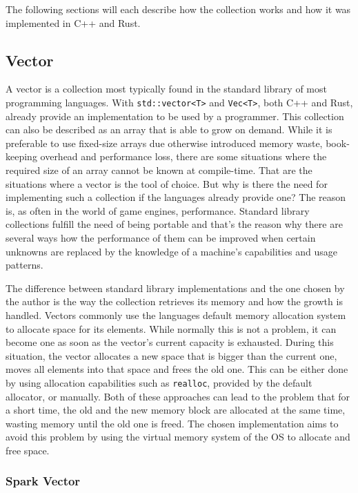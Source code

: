 The following sections will each describe how the collection works and how it was implemented in C++ and Rust.

\subsection{Vector}

A vector is a collection most typically found in the standard library of most programming languages. With \texttt{std::vector<T>} and \texttt{Vec<T>}, both C++ and Rust, already provide an implementation to be used by a programmer. This collection can also be described as an array that is able to grow on demand. While it is preferable to use fixed-size arrays due otherwise introduced memory waste, book-keeping overhead and performance loss, there are some situations where the required size of an array cannot be known at compile-time. That are the situations where a vector is the tool of choice. But why is there the need for implementing such a collection if the languages already provide one? The reason is, as often in the world of game engines, performance. Standard library collections fulfill the need of being portable and that's the reason why there are several ways how the performance of them can be improved when certain unknowns are replaced by the knowledge of a machine's capabilities and usage patterns. 

The difference between standard library implementations and the one chosen by the author is the way the collection retrieves its memory and how the growth is handled. Vectors commonly use the languages default memory allocation system to allocate space for its elements. While normally this is not a problem, it can become one as soon as the vector's current capacity is exhausted. During this situation, the vector allocates a new space that is bigger than the current one, moves all elements into that space and frees the old one. This can be either done by using allocation capabilities such as \texttt{realloc}, provided by the default allocator, or manually. Both of these approaches can lead to the problem that for a short time, the old and the new memory block are allocated at the same time, wasting memory until the old one is freed. The chosen implementation aims to avoid this problem by using the virtual memory system of the \ac{OS} to allocate and free space.

\subsubsection{Spark Vector}

